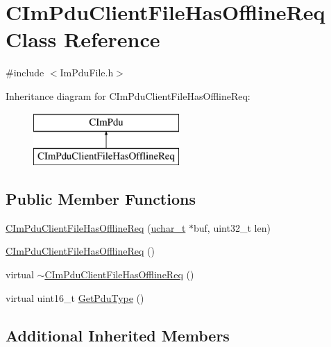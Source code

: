 \hypertarget{class_c_im_pdu_client_file_has_offline_req}{}\section{C\+Im\+Pdu\+Client\+File\+Has\+Offline\+Req Class Reference}
\label{class_c_im_pdu_client_file_has_offline_req}


{\ttfamily \#include $<$Im\+Pdu\+File.\+h$>$}

Inheritance diagram for C\+Im\+Pdu\+Client\+File\+Has\+Offline\+Req\+:\begin{figure}[H]
\begin{center}
\leavevmode
\includegraphics[height=2.000000cm]{class_c_im_pdu_client_file_has_offline_req}
\end{center}
\end{figure}
\subsection*{Public Member Functions}
\begin{DoxyCompactItemize}
\item 
\hyperlink{class_c_im_pdu_client_file_has_offline_req_a994e702e7c2bd6ae046f8b05cf45d67b}{C\+Im\+Pdu\+Client\+File\+Has\+Offline\+Req} (\hyperlink{base_2ostype_8h_a124ea0f8f4a23a0a286b5582137f0b8d}{uchar\+\_\+t} $\ast$buf, uint32\+\_\+t len)
\item 
\hyperlink{class_c_im_pdu_client_file_has_offline_req_af6dc14d69499234e5c38bcd04c216c42}{C\+Im\+Pdu\+Client\+File\+Has\+Offline\+Req} ()
\item 
virtual \hyperlink{class_c_im_pdu_client_file_has_offline_req_a9421951ba09bd76f8f88c1e8f17d4465}{$\sim$\+C\+Im\+Pdu\+Client\+File\+Has\+Offline\+Req} ()
\item 
virtual uint16\+\_\+t \hyperlink{class_c_im_pdu_client_file_has_offline_req_ace52a10ad3f5ca09ea098cfaf4003552}{Get\+Pdu\+Type} ()
\end{DoxyCompactItemize}
\subsection*{Additional Inherited Members}


